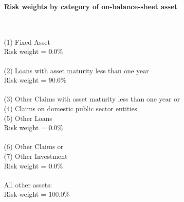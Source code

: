 \documentclass{article}
\begin{document}
\setlength{\parindent}{0em}
\begin{center}{\bf Risk weights by category of on-balance-sheet asset}\end{center}
~\\
~\\

(1) Fixed Asset\\
Risk weight = 0.0\%\\

~\\
(2) Loans with asset maturity less than one year \\
Risk weight = 90.0\%\\

~\\
(3) Other Claims with asset maturity less than one year or \\
(4) Claims on domestic public sector entities \\
(5) Other Loans\\
Risk weight = 0.0\%\\

~\\
(6) Other Claims or \\
(7) Other Investment \\
Risk weight = 0.0\%\\

~\\
All other assets:\\
Risk weight = 100.0\%\\

~\\
\end{document}

